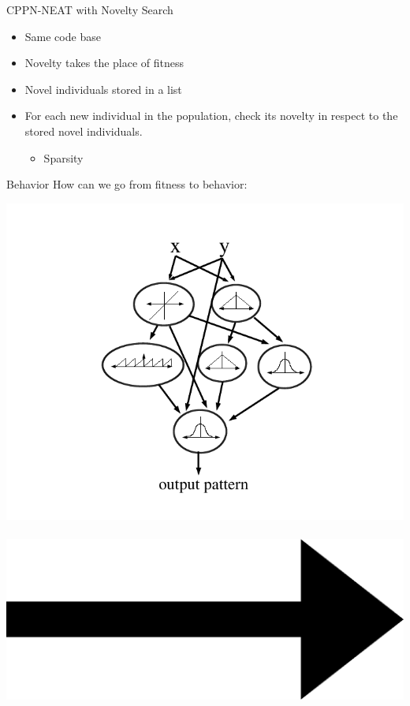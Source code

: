 \documentclass{beamer}
\begin{document}
\begin{frame}{CPPN-NEAT with Novelty Search~\cite{lehman2011abandoning}}
\begin{itemize}
\item Same code base
\item Novelty takes the place of fitness
\item Novel individuals stored in a list
\item For each new individual in the population, check its novelty in respect to the stored novel individuals.
\begin{itemize}
\item Sparsity
\end{itemize}
\end{itemize}
\end{frame}

\begin{frame}{Behavior}
How can we go from fitness to behavior:\\
\vspace{0.2cm}
\begin{center}
\includegraphics[height=0.15\textheight]{figures/cppnNetwork.png}\	
\includegraphics[height=0.05\textheight]{figures/Arrow_east.eps}\	

\end{center}
\end{frame}
\end{document}
